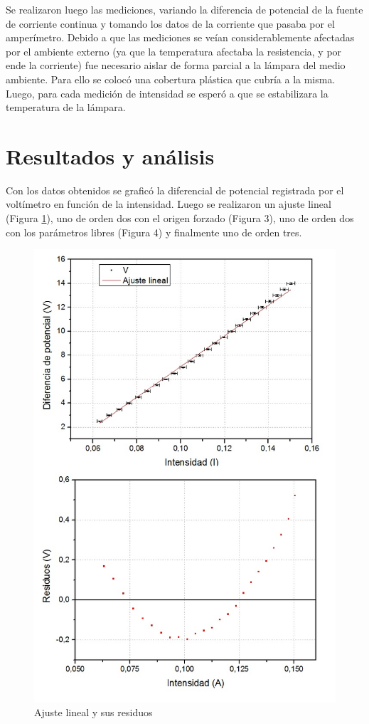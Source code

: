 \documentclass[twoside,twocolumn,a4paper]{article}
\begin{document}
Se realizaron luego las mediciones, variando la diferencia de potencial de la fuente de corriente continua y tomando los datos de la corriente que pasaba por el amper\'imetro. Debido a que las mediciones se ve\'ian considerablemente afectadas por el ambiente externo (ya que la temperatura afectaba la resistencia, y por ende la corriente) fue necesario aislar de forma parcial a la l\'ampara del medio ambiente. Para ello se coloc\'o una cobertura pl\'astica que cubr\'ia a la misma. Luego, para cada medici\'on de intensidad se esper\'o a que se estabilizara la temperatura de la l\'ampara.

\section{Resultados y an\'alisis}

Con los datos obtenidos se grafic\'o la diferencial de potencial registrada por el volt\'imetro en funci\'on de la intensidad. Luego se realizaron un ajuste lineal (Figura \ref{fig:line}), uno de orden dos con el origen forzado (Figura 3), uno de orden dos con los par\'ametros libres (Figura 4) y finalmente uno de orden tres.\par

\begin{figure}[h]
\includegraphics[width=\linewidth]{fig_line.jpg}
\caption{Ajuste lineal y sus residuos}
\label{fig:line}
\end{figure}
\end{document}
